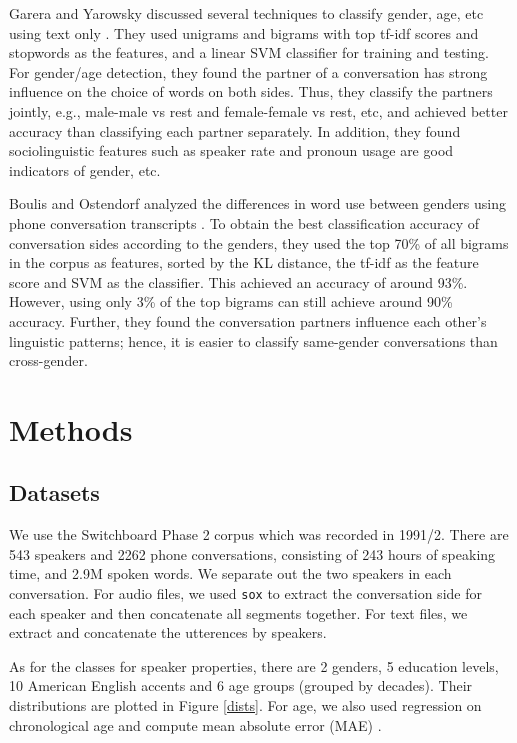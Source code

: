 \documentclass[a4paper]{article}
\begin{document}
Garera and Yarowsky discussed several techniques to classify gender, age, etc using text only \cite{garera}. They used unigrams and bigrams with top tf-idf scores and stopwords as the features, and a linear SVM classifier for training and testing. For gender/age detection, they found the partner of a conversation has strong influence on the choice of words on both sides. Thus, they classify the partners jointly, e.g., male-male vs rest and female-female vs rest, etc, and achieved better accuracy than classifying each partner separately. In addition, they found sociolinguistic features such as speaker rate and pronoun usage are good indicators of gender, etc.

Boulis and Ostendorf analyzed the differences in word use between genders using phone conversation transcripts \cite{boulis}. To obtain the best classification accuracy of conversation sides according to the genders, they used the top 70\% of all bigrams in the corpus as features, sorted by the KL distance, the tf-idf as the feature score and SVM as the classifier. This achieved an accuracy of around 93\%. However, using only 3\% of the top bigrams can still achieve around 90\% accuracy. Further, they found the conversation partners influence each other's linguistic patterns; hence, it is easier to classify same-gender conversations than cross-gender. 

\section{Methods}

\subsection{Datasets}
We use the Switchboard Phase 2 corpus which was recorded in 1991/2. There are 543 speakers and 2262 phone conversations, consisting of 243 hours of speaking time, and 2.9M spoken words. We separate out the two speakers in each conversation. For audio files, we used \texttt{sox} to extract the conversation side for each speaker and then concatenate all segments together. For text files, we extract and concatenate the utterences by speakers.

As for the classes for speaker properties, there are 2 genders, 5 education levels, 10 American English accents and 6 age groups (grouped by decades). Their distributions are plotted in Figure \ref{dists}. For age, we also used regression on chronological age and compute mean absolute error (MAE) .
\end{document}
